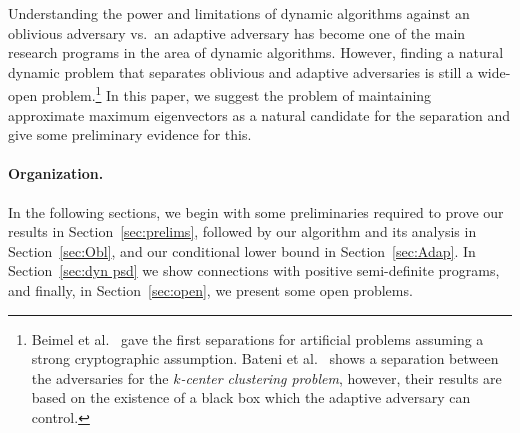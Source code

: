 Understanding the power and limitations of dynamic algorithms against an oblivious adversary vs.~an adaptive adversary has become one of the main research programs in the area of dynamic algorithms. However, finding a natural dynamic problem that separates oblivious and adaptive adversaries is still a wide-open problem.\footnote{
Beimel et al.~\cite{beimel2022dynamic} gave the first separations for artificial problems assuming a strong cryptographic assumption. Bateni et al.~\cite{bateni2023optimal} shows a separation between the adversaries for the {\it $k$-center clustering problem}, however, their results are based on the existence of a black box which the adaptive adversary can control.}
%
%
In this paper, we suggest the problem of maintaining approximate maximum eigenvectors as a natural candidate for the separation and 
give some preliminary evidence for this.

\paragraph{Organization.} In the following sections, we begin with some preliminaries required to prove our results in Section~\ref{sec:prelims}, followed by our algorithm and its analysis in Section~\ref{sec:Obl}, and our conditional lower bound in Section~\ref{sec:Adap}. In Section~\ref{sec:dyn psd} we show connections with positive semi-definite programs, and finally, in Section~\ref{sec:open}, we present some open problems.

